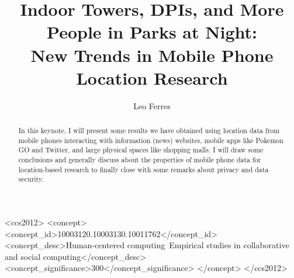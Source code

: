\documentclass[sigconf]{acmart}
\begin{document}
%
\title{Indoor Towers, DPIs, and More People in Parks at
  Night:\\New Trends in Mobile Phone Location Research}

%
\author{Leo Ferres}


%

%
\begin{abstract}
  In this keynote, I will present some results we have obtained using
  location data from mobile phones interacting with information (news)
  websites, mobile apps like Pokemon GO and Twitter, and large
  physical spaces like shopping malls. I will draw some conclusions
  and generally discuss about the properties of mobile phone data for
  location-based research to finally close with some remarks about
  privacy and data security.
\end{abstract}

%
\begin{CCSXML}
<ccs2012>
<concept>
<concept_id>10003120.10003130.10011762</concept_id>
<concept_desc>Human-centered computing~Empirical studies in collaborative and social computing</concept_desc>
<concept_significance>300</concept_significance>
</concept>
</ccs2012>
\end{CCSXML}
\end{document}
